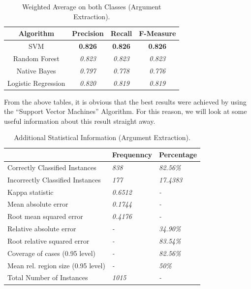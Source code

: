 \begin{table}[H]
\centering
\caption{Weighted Average on both Classes (Argument Extraction).}
\label{43_table_ref}
\begin{tabular}{cccc}
\hline
{\bf Algorithm}     & {\bf Precision} & {\bf Recall}    & {\bf F-Measure} \\ \hline
SVM                 & {\bf 0.826} 	 & {\bf 0.826}     & {\bf 0.826} \\
Random Forest       & {\it 0.823}     & {\it 0.823}     & {\it 0.823}     \\
Native Bayes        & {\it 0.797}     & {\it 0.778}     & {\it 0.776}     \\
Logistic Regression & {\it 0.820}     & {\it 0.819}     & {\it 0.819}     \\ \hline
\end{tabular}
\end{table}

From the above tables, it is obvious that the best results were achieved by using the ``Support Vector Machines'' Algorithm. For this reason, we will look at some useful information  about this result straight away.

\begin{table}[H]
\centering
\caption{Additional Statistical Information (Argument Extraction).}
\label{44_table_ref}
\begin{tabular}{lll}
\hline
                                   & {\bf Frequenncy} & {\bf Percentage} \\ \hline
Correctly Classified Instances     & {\it 838}        & {\it 82.56\%}    \\
Incorrectly Classified Instances   & {\it 177}        & {\it 17.4383}    \\
Kappa statistic                    & {\it 0.6512}     & {\it -}          \\
Mean absolute error                & {\it 0.1744}     & {\it -}          \\
Root mean squared error            & {\it 0.4176}     & {\it -}          \\
Relative absolute error            & {\it -}          & {\it 34.90\%}    \\
Root relative squared error        & {\it -}          & {\it 83.54\%}    \\
Coverage of cases (0.95 level)     & {\it -}          & {\it 82.56\%}    \\
Mean rel. region size (0.95 level) & {\it -}          & {\it 50\%}       \\
Total Number of Instances          & {\it 1015}       & {\it -}          \\ \hline
\end{tabular}
\end{table}

